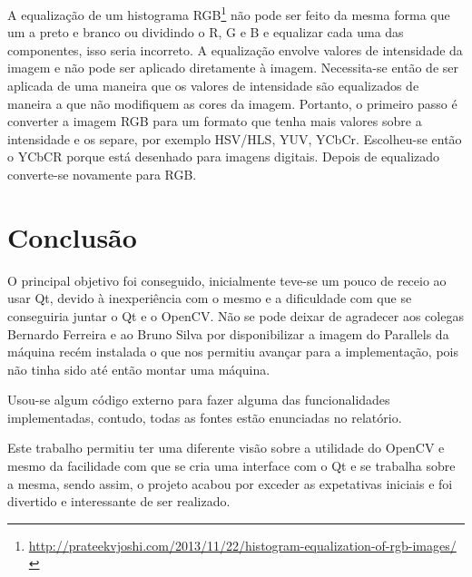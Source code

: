 \documentclass[pdftex,12pt,a4paper]{report}
\begin{document}
A equalização de um histograma RGB\footnote{\label{url5} \url{http://prateekvjoshi.com/2013/11/22/histogram-equalization-of-rgb-images/}} não pode ser feito da mesma forma que um a preto e branco ou dividindo o R, G e B e equalizar cada uma das componentes, isso seria incorreto. A equalização envolve valores de intensidade da imagem e não pode ser aplicado diretamente à imagem. Necessita-se então de ser aplicada de uma maneira que os valores de intensidade são equalizados de maneira a que não modifiquem as cores da imagem. Portanto, o primeiro passo é converter a imagem RGB para um formato que tenha mais valores sobre a intensidade e os separe, por exemplo HSV/HLS, YUV, YCbCr. Escolheu-se então o YCbCR porque está desenhado para imagens digitais. Depois de equalizado converte-se novamente para RGB.

\section{Conclusão}

O principal objetivo foi conseguido, inicialmente teve-se um pouco de receio ao usar Qt, devido à inexperiência com o mesmo e a dificuldade com que se conseguiria juntar o Qt e o OpenCV. Não se pode deixar de agradecer aos colegas Bernardo Ferreira e ao Bruno Silva por disponibilizar a imagem do Parallels da máquina recém instalada o que nos permitiu avançar para a implementação, pois não tinha sido até então montar uma máquina. 

Usou-se algum código externo para fazer alguma das funcionalidades implementadas, contudo, todas as fontes estão enunciadas no relatório. 

Este trabalho permitiu ter uma diferente visão sobre a utilidade do OpenCV e mesmo da facilidade com que se cria uma interface com o Qt e se trabalha sobre a mesma, sendo assim, o projeto acabou por exceder as expetativas iniciais e foi divertido e interessante de ser realizado.
\end{document}
